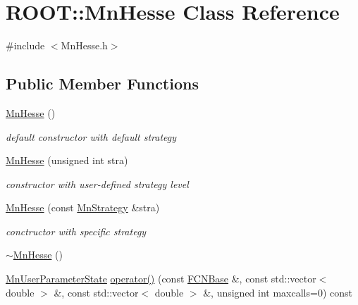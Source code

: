 \hypertarget{classROOT_1_1Minuit2_1_1MnHesse}{}\section{R\+O\+OT\+:\+:Mn\+Hesse Class Reference}
\label{classROOT_1_1Minuit2_1_1MnHesse}


{\ttfamily \#include $<$Mn\+Hesse.\+h$>$}

\subsection*{Public Member Functions}
\begin{DoxyCompactItemize}
\item 
\mbox{\hyperlink{classROOT_1_1Minuit2_1_1MnHesse_a3be9ef44f3e8808dbd225df9a22aeab8}{Mn\+Hesse}} ()
\begin{DoxyCompactList}\small\item\em default constructor with default strategy \end{DoxyCompactList}\item 
\mbox{\hyperlink{classROOT_1_1Minuit2_1_1MnHesse_ad68578086b8b53c029be88acdfe5ec62}{Mn\+Hesse}} (unsigned int stra)
\begin{DoxyCompactList}\small\item\em constructor with user-\/defined strategy level \end{DoxyCompactList}\item 
\mbox{\hyperlink{classROOT_1_1Minuit2_1_1MnHesse_a06f4f5211bf9c85c8a94fe3be518cdeb}{Mn\+Hesse}} (const \mbox{\hyperlink{classROOT_1_1Minuit2_1_1MnStrategy}{Mn\+Strategy}} \&stra)
\begin{DoxyCompactList}\small\item\em conctructor with specific strategy \end{DoxyCompactList}\item 
\mbox{\hyperlink{classROOT_1_1Minuit2_1_1MnHesse_a7e8672c0a87502a0c75c6c0f9923f7b8}{$\sim$\+Mn\+Hesse}} ()
\item 
\mbox{\hyperlink{classROOT_1_1Minuit2_1_1MnUserParameterState}{Mn\+User\+Parameter\+State}} \mbox{\hyperlink{classROOT_1_1Minuit2_1_1MnHesse_aa0af93c1c82038bab7ffe84c198fa176}{operator()}} (const \mbox{\hyperlink{classROOT_1_1Minuit2_1_1FCNBase}{F\+C\+N\+Base}} \&, const std\+::vector$<$ double $>$ \&, const std\+::vector$<$ double $>$ \&, unsigned int maxcalls=0) const
\item 

\end{DoxyCompactItemize}
